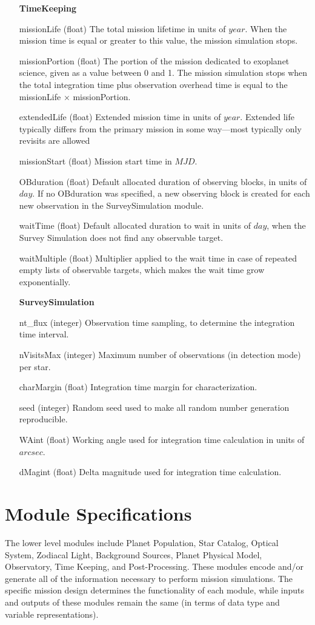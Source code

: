 \documentclass[cleanfoot]{asme2ej}
\begin{document}
\begin{itemize}[leftmargin=1.5in,font={\ttfamily}]
\item[\textbf{TimeKeeping}]
\item[missionLife] (float) The total mission lifetime in units of $ year $.  When the mission time is equal or greater to this value, the mission simulation stops.
\item[missionPortion] (float) The portion of the mission dedicated to exoplanet science, given as a value between 0 and 1. The mission simulation stops when the total integration time plus observation overhead time is equal to the missionLife $\times$ missionPortion.
\item[extendedLife] (float) Extended mission time in units of $ year $.  Extended life typically differs from the primary mission in some way---most typically only revisits are allowed
\item[missionStart] (float) Mission start time in $ MJD $. 
\item[OBduration] (float) Default allocated duration of observing blocks, in units of $day$. If no OBduration was specified, a new observing block is created for each new observation in the SurveySimulation module.
\item[waitTime] (float) Default allocated duration to wait in units of $day$, when the Survey Simulation does not find any observable target.
\item[waitMultiple] (float) Multiplier applied to the wait time in case of repeated empty lists of observable targets, which makes the wait time grow exponentially. 

\item[\textbf{SurveySimulation}]
\item[nt\_flux] (integer) Observation time sampling, to determine the integration time interval.
\item[nVisitsMax] (integer) Maximum number of observations (in detection mode) per star. 
\item[charMargin] (float) Integration time margin for characterization. 
\item[seed] (integer) Random seed used to make all random number generation reproducible.
\item[WAint] (float) Working angle used for integration time calculation in units of $arcsec$.
\item[dMagint] (float) Delta magnitude used for integration time calculation.


\end{itemize}

\section{Module Specifications}\label{sec:modules}
The lower level modules include Planet Population, Star Catalog, Optical System, Zodiacal Light, Background Sources, Planet Physical Model, Observatory, Time Keeping, and Post-Processing.  These modules encode and/or generate all of the information necessary to perform mission simulations.  The specific mission design determines the functionality of each module, while inputs and outputs of these modules remain the same (in terms of data type and variable representations).  
\end{document}
